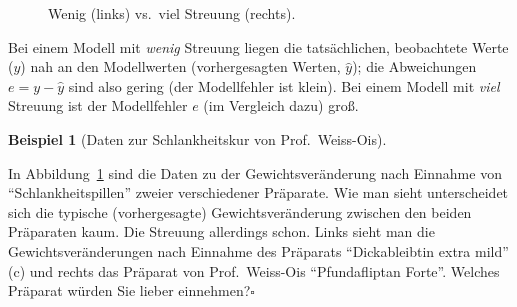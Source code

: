 \documentclass[
  letterpaper,
]{scrbook}
\theoremstyle{definition}
\newtheorem{example}{Beispiel}[chapter]
\theoremstyle{definition}
\theoremstyle{definition}
\theoremstyle{remark}
\begin{document}
\begin{figure}


\caption{\label{fig-streuung}Wenig (links) vs.~viel Streuung (rechts).}

\end{figure}%

Bei einem Modell mit \emph{wenig} Streuung liegen die tatsächlichen,
beobachtete Werte (\(y\)) nah an den Modellwerten (vorhergesagten
Werten, \(\hat{y}\)); die Abweichungen \(e = y - \hat{y}\) sind also
gering (der Modellfehler ist klein). Bei einem Modell mit \emph{viel}
Streuung ist der Modellfehler \(e\) (im Vergleich dazu) groß.

\begin{example}[Daten zur Schlankheitskur von
Prof.~Weiss-Ois]\protect\hypertarget{exm-weiss-ois}{}\label{exm-weiss-ois}

In Abbildung~\ref{fig-streuung} sind die Daten zu der
Gewichtsveränderung nach Einnahme von ``Schlankheitspillen'' zweier
verschiedener Präparate. Wie man sieht unterscheidet sich die typische
(vorhergesagte) Gewichtsveränderung zwischen den beiden Präparaten kaum.
Die Streuung allerdings schon. Links sieht man die Gewichtsveränderungen
nach Einnahme des Präparats ``Dickableibtin extra mild'' (c) und rechts
das Präparat von Prof.~Weiss-Ois ``Pfundafliptan Forte''. Welches
Präparat würden Sie lieber einnehmen?\(\square\)

\end{example}
\end{document}
